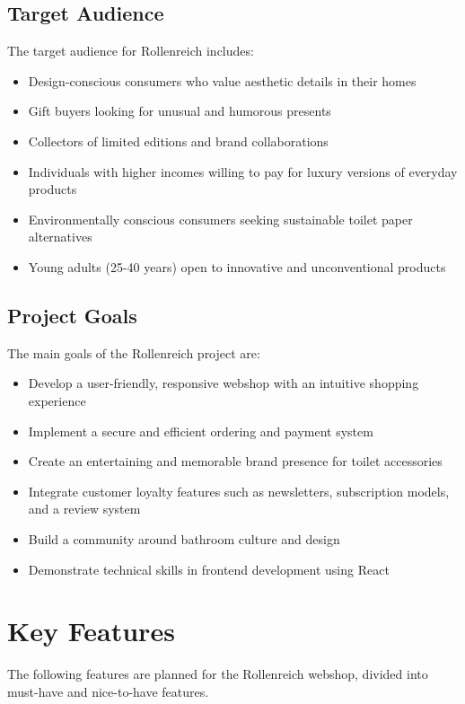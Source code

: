 \documentclass[a4paper,11pt]{article}
\begin{document}
\subsection{Target Audience}
The target audience for Rollenreich includes:
\begin{itemize}
    \item Design-conscious consumers who value aesthetic details in their homes
    \item Gift buyers looking for unusual and humorous presents
    \item Collectors of limited editions and brand collaborations
    \item Individuals with higher incomes willing to pay for luxury versions of everyday products
    \item Environmentally conscious consumers seeking sustainable toilet paper alternatives
    \item Young adults (25-40 years) open to innovative and unconventional products
\end{itemize}

\subsection{Project Goals}
The main goals of the Rollenreich project are:
\begin{itemize}
    \item Develop a user-friendly, responsive webshop with an intuitive shopping experience
    \item Implement a secure and efficient ordering and payment system
    \item Create an entertaining and memorable brand presence for toilet accessories
    \item Integrate customer loyalty features such as newsletters, subscription models, and a review system
    \item Build a community around bathroom culture and design
    \item Demonstrate technical skills in frontend development using React
\end{itemize}

\section{Key Features}
The following features are planned for the Rollenreich webshop, divided into must-have and nice-to-have features.
\end{document}
